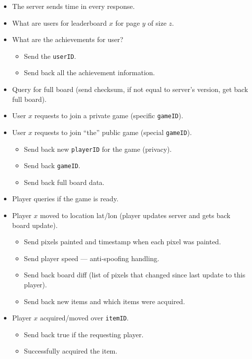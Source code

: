 \documentclass[oneside,12pt]{scrbook}
\begin{document}


\begin{itemize}
    \item The server sends time in every response.
    \item What are users for leaderboard $x$ for page $y$ of size $z$.
    \item What are the achievements for user?
        \begin{itemize}
            \item Send the \texttt{userID}.
            \item Send back all the achievement information.
        \end{itemize}

    \item Query for full board (send checksum, if not equal to server's version, get back full board).

    \item User $x$ requests to join a private game (specific \texttt{gameID}).
    \item User $x$ requests to join ``the'' public game (special \texttt{gameID}).
        \begin{itemize}
            \item Send back new \texttt{playerID} for the game (privacy).
            \item Send back \texttt{gameID}.
            \item Send back full board data.
        \end{itemize}

    \item Player queries if the game is ready.

    \item Player $x$ moved to location lat/lon (player updates server and gets back board update).
        \begin{itemize}
            \item Send pixels painted and timestamp when each pixel was painted.
            \item Send player speed --- anti-spoofing handling.
            \item Send back board diff (list of pixels that changed since last update to this player).
            \item Send back new items and which items were acquired.
        \end{itemize}

    \item Player $x$ acquired/moved over \texttt{itemID}.
        \begin{itemize}
            \item Send back true if the requesting player.
            \item Successfully acquired the item.
        \end{itemize}
\end{itemize}
\end{document}
